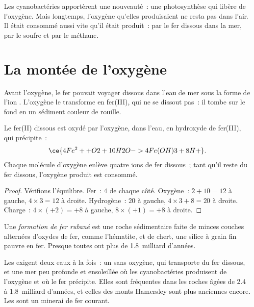 Les cyanobactéries apportèrent une nouveauté~: une photosynthèse qui libère
de l'oxygène. Mais longtemps, l'oxygène qu'elles produisaient ne resta pas
dans l'air. Il était consommé aussi vite qu'il était produit~: par le fer
dissous dans la mer, par le soufre et par le méthane.

\section{La montée de l'oxygène}

Avant l'oxygène, le fer pouvait voyager dissous dans l'eau de mer sous la
forme de l'ion . L'oxygène le transforme en fer(III), qui ne se
dissout pas~: il tombe sur le fond en un sédiment couleur de rouille.

\begin{proposition}\label{prop:g12:early-earth:iron}
Le fer(II) dissous est oxydé par l'oxygène, dans l'eau, en hydroxyde de
fer(III), qui précipite~:
\[
  \ce{4Fe^2+ + O2 + 10H2O -> 4Fe(OH)3 + 8H+} .
\]
Chaque molécule d'oxygène enlève quatre ions de fer dissous~; tant qu'il
reste du fer dissous, l'oxygène produit est consommé.
\end{proposition}

\begin{proof}
Vérifions l'équilibre. Fer~: 4 de chaque côté. Oxygène~: $2 + 10 = 12$ à
gauche, $4 \times 3 = 12$ à droite. Hydrogène~: $20$ à gauche, $4 \times 3 + 8 =
20$ à droite. Charge~: $4 \times (+2) = +8$ à gauche, $8 \times (+1) =
+8$ à droite.
\end{proof}

\begin{definition}\label{def:g12:early-earth:bif}
Une \emph{formation de fer rubané}
est une roche sédimentaire faite de minces couches alternées d'oxydes de
fer, comme l'hématite, et de chert, une silice à grain fin pauvre en fer.
Presque toutes ont plus de 1.8~milliard d'années.
\end{definition}

Les  exigent deux eaux à la fois~: un  sans oxygène, qui transporte du fer dissous, et une mer peu
profonde et ensoleillée où les cyanobactéries produisent de l'oxygène et où
le fer précipite. Elles sont fréquentes dans les roches âgées de 2.4 à
1.8~milliard d'années, et celles des monts Hamersley sont plus anciennes
encore. Les  sont un minerai de fer courant.

